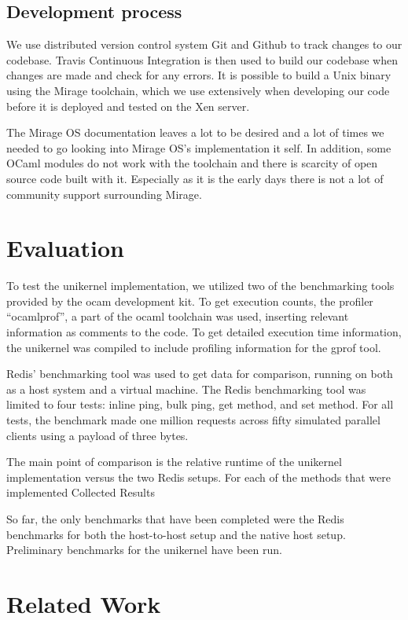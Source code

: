 \documentclass[english,10pt,twocolumn]{article}
\begin{document}
\subsection{Development process}

We use distributed version control system Git and Github to track changes to our codebase. Travis Continuous Integration is then used to build our codebase when changes are made and check for any errors. It is possible to build a Unix binary using the Mirage toolchain, which we use extensively when developing our code before it is deployed and tested on the Xen server. 

The Mirage OS documentation leaves a lot to be desired and a lot of times we needed to go looking into Mirage OS's implementation it self. In addition, some OCaml modules do not work with the toolchain and there is scarcity of open source code built with it. Especially as it is the early days there is not a lot of community support surrounding Mirage.


\section{Evaluation}

To test the unikernel implementation, we utilized two of the benchmarking tools provided by the  ocam development kit. To get execution counts, the profiler “ocamlprof”, a part of the ocaml toolchain was used, inserting relevant information as comments to the code. To get detailed execution time information, the unikernel was compiled to include profiling information for the gprof tool.

Redis’ benchmarking tool was used to get data for comparison, running on both as a host system and a virtual machine. The Redis benchmarking tool was limited to four tests: inline ping, bulk ping, get method, and set method. For all tests, the benchmark made one million requests across fifty simulated parallel clients using a payload of three bytes.

The main point of comparison is the relative runtime of the unikernel implementation versus the two Redis setups. For each of the methods that were implemented
Collected Results

So far, the only benchmarks that have been completed were the Redis benchmarks for both the host-to-host setup and the native host setup. Preliminary benchmarks for the unikernel have been run.




\section{Related Work}
\end{document}
